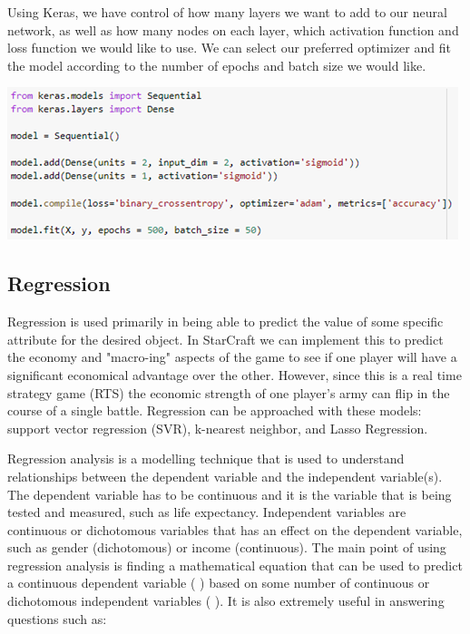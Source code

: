 \documentclass[a4paper,12pt]{report}
\begin{document}
Using Keras, we have control of how many layers we want to add to our neural network, as well as how many nodes on each layer, which activation function and loss function we would like to use. We can select our preferred optimizer and fit the model according to the number of epochs and batch size we would like. 

\begin{center}
    \captionsetup{type=figure}
    \includegraphics[width=.9\linewidth]{media/kerasmodels.png}
    \label{fig:kerasmodels}
\end{center}

\subsection{Regression}

Regression is used primarily in being able to predict the value of some specific attribute for the desired object. In StarCraft we can implement this to predict the economy and "macro-ing" aspects of the game to see if one player will have a significant economical advantage over the other. However, since this is a real time strategy game (RTS) the economic strength of one player’s army can flip in the course of a single battle. Regression can be approached with these models: support vector regression (SVR), k-nearest neighbor, and Lasso Regression.

Regression analysis is a modelling technique that is used to understand relationships between the dependent variable and the independent variable(s). The dependent variable has to be continuous and it is the variable that is being tested and measured, such as life expectancy. Independent variables are continuous or dichotomous variables that has an effect on the dependent variable, such as gender (dichotomous) or income (continuous). The main point of using regression analysis is finding a mathematical equation that can be used to predict a continuous dependent variable ( ) based on some number of continuous or dichotomous independent variables ( ). It is also extremely useful in answering questions such as:
\end{document}
